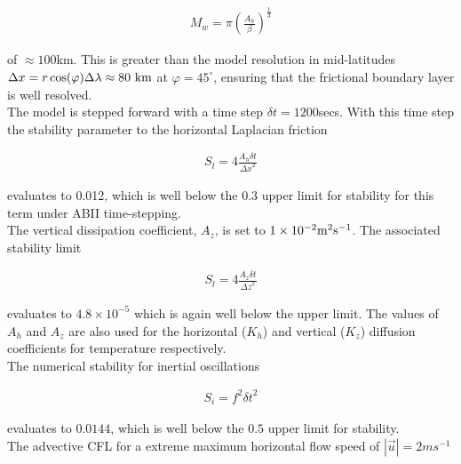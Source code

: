 \begin{eqnarray}
\label{EQ:eg-fourlayer-munk_layer}
M_{w} = \pi ( \frac { A_{h} }{ \beta } )^{\frac{1}{3}}
\end{eqnarray}

\noindent  of $\approx 100$km. This is greater than the model
resolution in mid-latitudes 
$\Delta x=r \cos(\varphi) \Delta \lambda \approx 80~{\rm km}$ at
$\varphi=45^{\circ}$, ensuring that the frictional 
boundary layer is well resolved.
\\

\noindent The model is stepped forward with a 
time step $\delta t=1200$secs. With this time step the stability 
parameter to the horizontal Laplacian friction

\begin{eqnarray}
\label{EQ:eg-fourlayer-laplacian_stability}
S_{l} = 4 \frac{A_{h} \delta t}{{\Delta x}^2}
\end{eqnarray}

\noindent evaluates to 0.012, which is well below the 0.3 upper limit
for stability for this term under ABII time-stepping.
\\

\noindent The vertical dissipation coefficient, $A_{z}$, is set to 
$1\times10^{-2} {\rm m}^2{\rm s}^{-1}$. The associated stability limit

\begin{eqnarray}
\label{EQ:eg-fourlayer-laplacian_stability_z}
S_{l} = 4 \frac{A_{z} \delta t}{{\Delta z}^2}
\end{eqnarray}

\noindent evaluates to $4.8 \times 10^{-5}$ which is again well below
the upper limit.
The values of $A_{h}$ and $A_{z}$ are also used for the horizontal ($K_{h}$) 
and vertical ($K_{z}$) diffusion coefficients for temperature respectively.
\\

\noindent The numerical stability for inertial oscillations

\begin{eqnarray}
\label{EQ:eg-fourlayer-inertial_stability}
S_{i} = f^{2} {\delta t}^2
\end{eqnarray}

\noindent evaluates to $0.0144$, which is well below the $0.5$ upper 
limit for stability.
\\

\noindent The advective CFL for a extreme maximum 
horizontal flow
speed of $ | \vec{u} | = 2 ms^{-1}$

